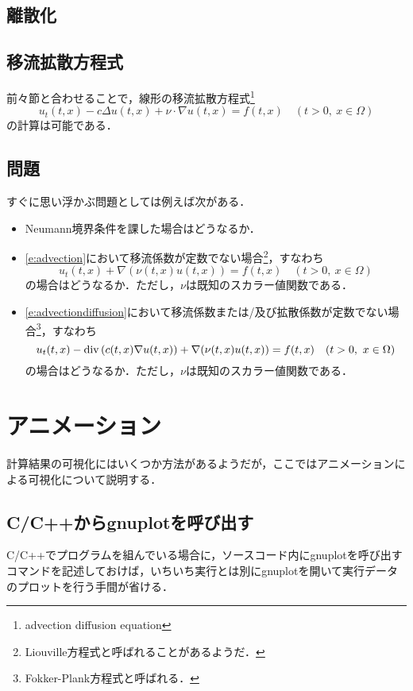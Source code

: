 \subsection{離散化}




\subsection{移流拡散方程式}
前々節と合わせることで，線形の移流拡散方程式\footnote{advection diffusion equation}
\begin{equation}
\label{e:advectiondiffusion}
u_t(t,x)-c\Delta u(t,x)+\nu\cdot\nabla u(t,x)=f(t,x)\quad(t>0,\ x\in\Omega)
\end{equation}
の計算は可能である．

\subsection{問題}
すぐに思い浮かぶ問題としては例えば次がある．
\begin{itemize}
\item Neumann境界条件を課した場合はどうなるか．
\item \eqref{e:advection}において移流係数が定数でない場合\footnote{Liouville方程式と呼ばれることがあるようだ．}，すなわち
$$
u_t(t,x)+\nabla(\nu(t,x) u(t,x))=f(t,x)\quad(t>0,\ x\in\Omega)
$$
の場合はどうなるか．ただし，$\nu$は既知のスカラー値関数である．
\item \eqref{e:advectiondiffusion}において移流係数または/及び拡散係数が定数でない場合\footnote{Fokker-Plank方程式と呼ばれる．}，すなわち
$$
u_t(t,x)-\operatorname{\mathrm{div}\,}(c(t,x)\nabla u(t,x))+\nabla(\nu(t,x)u(t,x))=f(t,x)\quad(t>0,\ x\in\Omega)
$$
の場合はどうなるか．ただし，$\nu$は既知のスカラー値関数である．
\end{itemize}










\section{アニメーション}
計算結果の可視化にはいくつか方法があるようだが，ここではアニメーションによる可視化について説明する．
\subsection{ C/C++からgnuplotを呼び出す}
C/C++でプログラムを組んでいる場合に，ソースコード内にgnuplotを呼び出すコマンドを記述しておけば，いちいち実行とは別にgnuplotを開いて実行データのプロットを行う手間が省ける．

